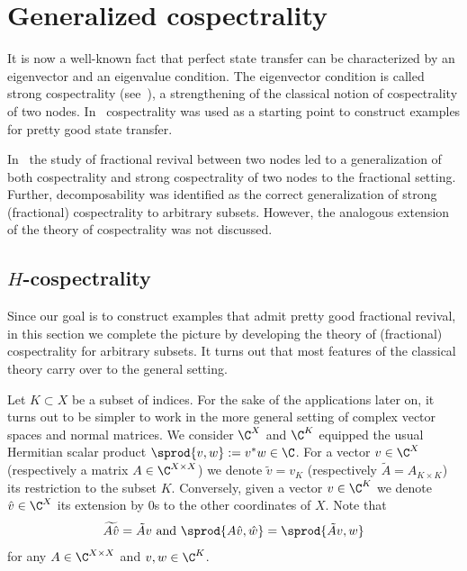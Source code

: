 \section{Generalized cospectrality}\label{sec:gen-cospectral}


It is now a well-known fact that perfect state transfer can be characterized by an eigenvector and an eigenvalue condition. The eigenvector condition is called strong cospectrality (see~\cite{godsil_smith_2017}), a strengthening of the classical notion of cospectrality of two nodes. In~\cite{invol, eisenberg2019pretty} cospectrality was used as a starting point to construct examples for pretty good state transfer. 

In~\cite{chan2020fundamentals} the study of fractional revival between two nodes led to a generalization of both cospectrality and strong cospectrality of two nodes to the fractional setting. Further, decomposability was identified as the correct generalization of strong (fractional) cospectrality to arbitrary subsets. However, the analogous extension of the theory of cospectrality was not discussed.


\subsection{\texorpdfstring{$H$}{H}-cospectrality}\label{sec:h-cospectral}

Since our goal is to construct examples that admit pretty good fractional revival, in this section we complete the picture by developing the theory of (fractional) cospectrality for arbitrary subsets. It turns out that most features of the classical theory carry over to the general setting. 

Let $K \subset X$ be a subset of indices. For the sake of the applications later on, it turns out to be simpler to work in the more general setting of complex vector spaces and normal matrices. We consider $\C^X$ and $\C^K$ equipped the usual Hermitian scalar product $\sprod{v,w} := v^* w \in \C$. For a vector $v \in \C^X$ (respectively a matrix $A \in \C^{X \times X}$) we denote $\tilde{v} = v_K$ (respectively $\tilde{A} = A_{K\times K}$) its restriction to the subset $K$. Conversely, given a vector $v \in \C^K$ we denote $\hat{v} \in \C^X$ its extension by 0s to the other coordinates of $X$. Note that 
\begin{equation}\label{eq:tilde} \widetilde{A \hat{v}} = \tilde{A} v \mbox{ and } \sprod{A \hat{v}, \hat{w}} = \sprod{\tilde{A} v, w} \end{equation} for any $A \in \C^{X \times X}$ and $v,w \in \C^K$.

